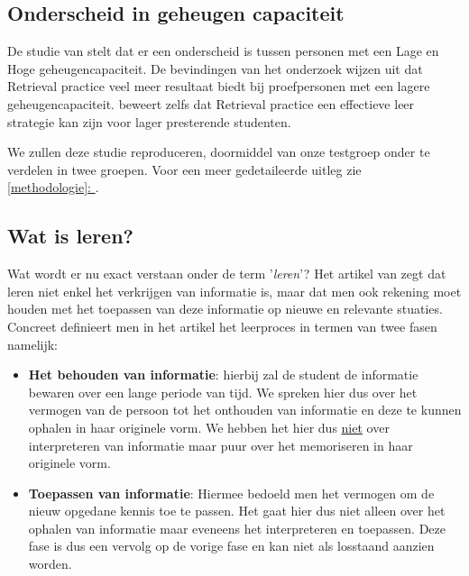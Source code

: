 \documentclass{hogent-article}
\newcommand{\customref}[1]{\underline{\ref{#1}: \nameref{#1}}}
\begin{document}
\subsection{Onderscheid in geheugen capaciteit}
\label{geheugencapaciteit}
De studie van \textcite{Agarwal_2016} stelt dat er een onderscheid is tussen personen met een Lage en Hoge geheugencapaciteit. De bevindingen van het onderzoek wijzen uit dat Retrieval practice veel meer resultaat biedt bij proefpersonen met een lagere geheugencapaciteit. \textcite{Agarwal_2016} beweert zelfs dat Retrieval practice een effectieve leer strategie kan zijn voor lager presterende studenten.\\
\par
\noindent
We zullen deze studie reproduceren, doormiddel van onze testgroep onder te verdelen in twee groepen. Voor een meer gedetaileerde uitleg zie\\ \customref{methodologie} .

\subsection{Wat is leren?}
Wat wordt er nu exact verstaan onder de term '\textit{leren}'? Het artikel van \textcite{Mayer_2002} zegt dat leren niet enkel het verkrijgen van informatie is, maar dat men ook rekening moet houden met het toepassen van deze informatie op nieuwe en relevante stuaties. Concreet definieert men in het artikel het leerproces in termen van twee fasen namelijk:\\

\begin{itemize}
	\item \textbf{Het behouden van informatie}: hierbij zal de student de informatie bewaren over een lange periode van tijd. We spreken hier dus over het vermogen van de persoon tot het onthouden van informatie en deze te kunnen ophalen in haar originele vorm. We hebben het hier dus \underline{niet} over interpreteren van informatie maar puur over het memoriseren in haar originele vorm.\\
	
	\item \textbf{Toepassen van informatie}: Hiermee bedoeld men het vermogen om de nieuw opgedane kennis toe te passen. Het  gaat hier dus niet alleen over het ophalen van informatie maar eveneens het interpreteren en toepassen. Deze fase is dus een vervolg op de vorige fase en kan niet als losstaand aanzien worden.
\end{itemize}
\end{document}
